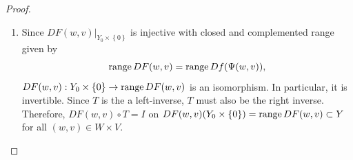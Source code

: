 \documentclass[a4paper]{article}
\begin{document}
\begin{proof}
{\begin{enumerate}
\begin{enumerate}
              \item Let $y \in Y_0$. We want to show that $T \circ DF(w,
                    v) (y, 0) = (y, 0)$. Again, note that
                    \[
                      DF(w, v) = Df(\Psi(w, v)) D\Psi(w, v).
                    \]
                    Suppose $D \Psi(w, v)(y, 0) = h$. As shown in part 1,
                    we have
                    \[
                      Dg(x) h = (\py \circ Df(x) (h), \px h).
                    \]
                    for all $x \in U$. It follows that $\py \circ
                    Df(\Psi(w, v)) h = y$ and $\px h = 0$. Therefore,
                    \[
                      \begin{aligned}
                        T \circ DF(w, v) (y, 0)
                        = T \circ Df(\Psi(w, v)) h
                        = (\py \circ Df(\Psi(w, v)) h, 0) = (y, 0).
                      \end{aligned}
                    \]
                    This implies that $T \in \L(Y; Y_0 \times \left\{ 0
                    \right\})$ defined by $Th = (\py h, 0)$ is a left
                    inverse of $DF(w, v)$ restricted on $Y_0 \times
                    \left\{ 0 \right\}$.

              \item Since $DF(w, v) \vert_{Y_0 \times \left\{ 0 \right\}}$
                    has a left inverse, $DF(w, v) \vert_{Y_0 \times
                    \left\{ 0 \right\}}$ is injective with its range
                    closed and complemented. In addition, from part (b),
                    we know that $\ran DF(w, v) = \ran Df(\Psi(w, v))$, as
                    desired.

            \end{enumerate}

      \item Since $DF(w, v) \vert_{Y_0 \times \left\{ 0 \right\}}$ is
            injective with closed and complemented range given by
            \[
              \operatorname{range} DF(w, v) = \operatorname{range} Df(\Psi(w, v)),
            \]
            $DF(w,v) :
              Y_0 \times \left\{ 0 \right\} \to \operatorname{range} DF(w, v)$
            is an isomorphism.
            In particular, it is invertible. Since $T$ is the a left-inverse,
            $T$ must also be the right inverse. Therefore,
            $DF(w, v) \circ T = I$ on $DF(w, v)(Y_0 \times \left\{ 0 \right\})
              = \operatorname{range} DF(w, v) \subset Y$ for all $(w, v) \in W \times V$.


\end{enumerate}}
\end{proof}
\end{document}
